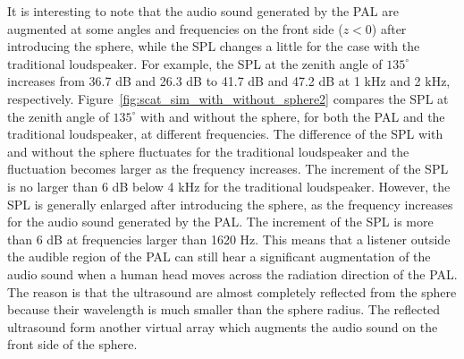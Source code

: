 It is interesting to note that the audio sound generated by the PAL are augmented at some angles and frequencies on the front side ($z < 0$) after introducing the sphere, while the SPL changes a little for the case with the traditional loudspeaker. 
For example, the SPL at the zenith angle of $135^\circ$ increases from 36.7 dB and 26.3 dB to 41.7 dB and 47.2 dB at 1 kHz and 2 kHz, respectively. 
Figure~\ref{fig:scat_sim_with_without_sphere2} compares the SPL at the zenith angle of $135^\circ$ with and without the sphere, for both the PAL and the traditional loudspeaker, at different frequencies. 
The difference of the SPL with and without the sphere fluctuates for the traditional loudspeaker and the fluctuation becomes larger as the frequency increases. The increment of the SPL is no larger than 6 dB below 4 kHz for the traditional loudspeaker. 
However, the SPL is generally enlarged after introducing the sphere, as the frequency increases for the audio sound generated by the PAL. The increment of the SPL is more than 6 dB at frequencies larger than 1620 Hz. This means that a listener outside the audible region of the PAL can still hear a significant augmentation of the audio sound when a human head moves across the radiation direction of the PAL. The reason is that the ultrasound are almost completely reflected from the sphere because their wavelength is much smaller than the sphere radius. The reflected ultrasound form another virtual array which augments the audio sound on the front side of the sphere.

